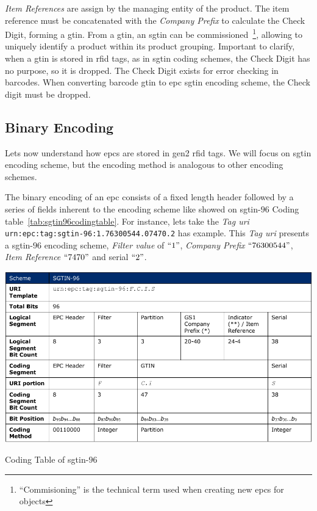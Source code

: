 \emph{Item References} are assign by the managing entity of the product.
The item reference must be concatenated with the \emph{Company Prefix} to calculate the Check Digit, forming a \ac{gtin}.
From a \ac{gtin}, an \ac{sgtin} can be commissioned~\footnote{``Commisioning'' is the technical term used when creating new \acp{epc} for objects}, allowing to uniquely identify a product within its product grouping.
Important to clarify, when a \ac{gtin} is stored in \ac{rfid} tags, as in \ac{sgtin} coding schemes, the Check Digit has no purpose, so it is dropped. The Check Digit exists for error checking in barcodes. When converting barcode \ac{gtin} to \ac{epc} \ac{sgtin} encoding scheme, the Check digit must be dropped.

\subsection{Binary Encoding} \label{sec:binencoding}

Lets now understand how \acp{epc} are stored in \ac{gen2} \ac{rfid} tags.
We will focus on \ac{sgtin} encoding scheme, but the encoding method is analogous to other encoding schemes.

The binary encoding of an \ac{epc} consists of a fixed length header followed by a series of fields inherent to the encoding scheme like showed on \ac{sgtin}-$96$ Coding table~\ref{tab:sgtin96codingtable}.
For instance, lets take the \emph{Tag \ac{uri}}
\texttt{urn:epc:tag:sgtin-96:1.76300544.07470.2}
has example.
This \emph{Tag \ac{uri}} presents a \ac{sgtin}-$96$ encoding scheme, \emph{Filter value} of $``1"$, \emph{Company Prefix} $``76300544"$, \emph{Item Reference} $``7470"$ and serial $``2"$.

\begin{table}[]
    \centering
    \includegraphics[width=\textwidth]{./figs/02-state-of-the-art/table_codingtable.pdf}
    \caption[Coding Table of \ac{sgtin}-$96$]{Coding Table of \ac{sgtin}-$96$~\cite{EPCTagData}} 
    \label{tab:sgtin96codingtable}
\end{table}

